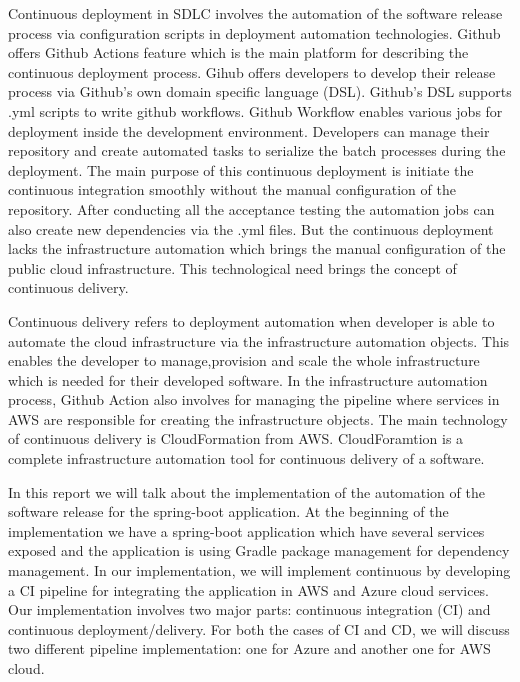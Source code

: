 Continuous deployment in SDLC involves the automation of the software release process via configuration scripts in deployment automation technologies. Github offers Github Actions feature which is the main platform for describing the continuous deployment process. Gihub offers developers to develop their release process via Github's own domain specific language (DSL). Github's DSL supports {{.yml}} scripts to write github workflows. Github Workflow enables various jobs for deployment inside the development environment. Developers can manage their repository and create automated tasks to serialize the batch processes during the deployment. The main purpose of this continuous deployment is initiate the continuous integration smoothly without the manual configuration of the repository. After conducting all the acceptance testing the automation jobs can also create new dependencies via the {{.yml}} files. But the continuous deployment lacks the infrastructure automation which brings the manual configuration of the public cloud infrastructure. This technological need brings the concept of continuous delivery.

Continuous delivery refers to deployment automation when developer is able to automate the cloud infrastructure via the infrastructure automation objects. This enables the developer to manage,provision and scale the whole infrastructure which is needed for their developed software. In the infrastructure automation process, Github Action also involves for managing the pipeline where services in AWS are responsible for creating the infrastructure objects. The main technology of continuous delivery is CloudFormation from AWS. CloudForamtion is a complete infrastructure automation tool for continuous delivery of a software. 

In this report we will talk about the implementation of the automation of the software release for the spring-boot application. At the beginning of the implementation we have a spring-boot application which have several services exposed and the application is using Gradle package management for dependency management. In our implementation, we will implement continuous by developing a CI pipeline for integrating the application in AWS and Azure cloud services. Our implementation involves two major parts: continuous integration (CI) and continuous deployment/delivery. For both the cases of CI and CD, we will discuss two different pipeline implementation: one for Azure and another one for AWS cloud. 

